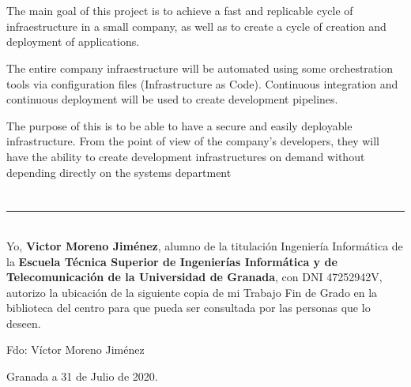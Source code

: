 \\

\vspace{0.7cm}
\\

The main goal of this project is to achieve a fast and replicable cycle of infraestructure in a small company, as well as to create a cycle of creation and deployment of applications. \bigskip

The entire company infraestructure will be automated using some orchestration tools via configuration files (Infrastructure as Code). Continuous integration and continuous deployment will be used to create development pipelines. \bigskip

The purpose of this is to be able to have a secure and easily deployable infrastructure. From the point of view of the company's developers, they will have the ability to create development infrastructures on demand without depending directly on the systems department \bigskip


\chapter*{}
\thispagestyle{empty}

\noindent\rule[-1ex]{\textwidth}{2pt}\\[4.5ex]

Yo, \textbf{Victor Moreno Jiménez}, alumno de la titulación Ingeniería Informática de la \textbf{Escuela Técnica Superior
de Ingenierías Informática y de Telecomunicación de la Universidad de Granada}, con DNI 47252942V, autorizo la
ubicación de la siguiente copia de mi Trabajo Fin de Grado en la biblioteca del centro para que pueda ser
consultada por las personas que lo deseen.

\vspace{6cm}

\noindent Fdo: Víctor Moreno Jiménez

\vspace{2cm}

\begin{flushright}
Granada a 31 de Julio de 2020.
\end{flushright}


\chapter*{}
\thispagestyle{empty}

